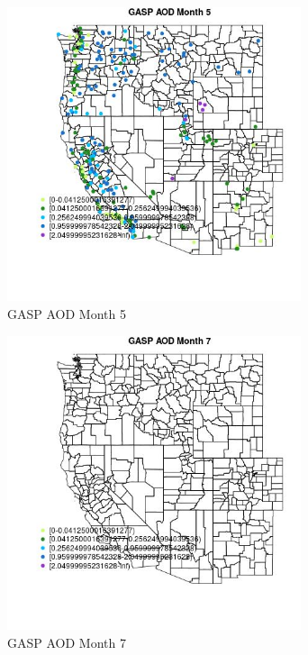 \begin{figure} 
\centering  
\includegraphics[width=0.77\textwidth]{Code_Outputs/Report_ML_input_PM25_Step4_part_e_de_duplicated_aves_compiled_2019-05-18wNAs_MapObsMo5GASP_AOD.jpg} 
\caption{\label{fig:Report_ML_input_PM25_Step4_part_e_de_duplicated_aves_compiled_2019-05-18wNAsMapObsMo5GASP_AOD}GASP AOD Month 5} 
\end{figure} 
 

\clearpage 

\begin{figure} 
\centering  
\includegraphics[width=0.77\textwidth]{Code_Outputs/Report_ML_input_PM25_Step4_part_e_de_duplicated_aves_compiled_2019-05-18wNAs_MapObsMo7GASP_AOD.jpg} 
\caption{\label{fig:Report_ML_input_PM25_Step4_part_e_de_duplicated_aves_compiled_2019-05-18wNAsMapObsMo7GASP_AOD}GASP AOD Month 7} 
\end{figure} 
 

